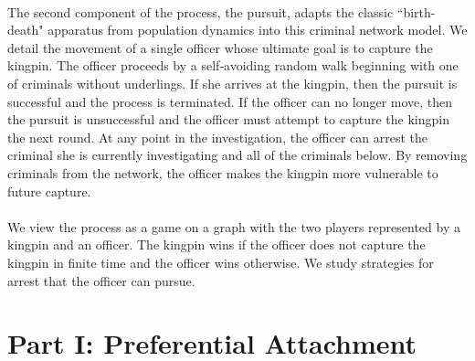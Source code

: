 \documentclass[11pt]{article}
\theoremstyle{plain}
\theoremstyle{definition}
\begin{document}
\\
The second component of the process, the pursuit, adapts the classic ``birth-death" apparatus from population dynamics \cite{kendall, gardiner} into this criminal network model.  We detail the movement of a single officer whose ultimate goal is to capture the kingpin.  The officer proceeds by a self-avoiding random walk beginning with one of criminals without underlings.  If she arrives at the kingpin, then the pursuit is successful and the process is terminated.  If the officer can no longer move, then the pursuit is unsuccessful and the officer must attempt to capture the kingpin the next round.  At any point in the investigation, the officer can arrest the criminal she is currently investigating and all of the criminals below.  By removing criminals from the network, the officer makes the kingpin more vulnerable to future capture.\\
\\
We view the process as a game on a graph with the two players represented by a kingpin and an officer.  The kingpin wins if the officer does not capture the kingpin in finite time and the officer wins otherwise.  We study strategies for arrest that the officer can pursue.


\section*{Part I: Preferential Attachment}
\end{document}
